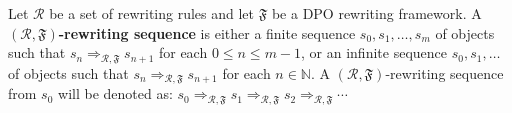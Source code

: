 \begin{definition}
    Let \(\mathcal{R}\) be a set of rewriting rules and let $\mathfrak{F}$ be a DPO rewriting framework.
    A \textbf{$(\mathcal{R},\mathfrak{F})$-rewriting sequence} is either a finite sequence \(s_0,s_1,\hdots, s_m\) of objects such that \(s_n \Rightarrow_{\mathcal{R},\mathfrak{F}} s_{n+1}\) for each \( 0 \leq n \leq m-1\), or an infinite sequence \(s_0,s_1,\hdots\) of objects such that \(s_n \Rightarrow_{\mathcal{R},\mathfrak{F}} s_{n+1}\) for each \(n \in \mathbb{N}\).
    A $(\mathcal{R},\mathfrak{F})$-rewriting sequence from \( s_0 \) will be denoted as:
    \(
    s_0 \Rightarrow_{\mathcal{R},\mathfrak{F}} s_1 \Rightarrow_{\mathcal{R},\mathfrak{F}} s_2 \Rightarrow_{\mathcal{R},\mathfrak{F}} \cdots 
    \)
\end{definition}

